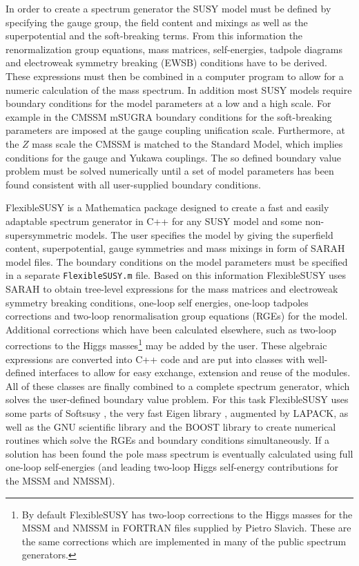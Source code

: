 \documentclass[final,3p,11pt,pdflatex]{elsarticle}
\makeatletter
\newcommand{\sarah}{SARAH\@\xspace}
\newcommand{\fs}{FlexibleSUSY\@\xspace}
\newcommand{\mathematica}{Mathematica\xspace}
\newcommand{\code}[1]{\lstinline|#1|}  %
\makeatother
\begin{document}
In order to create a spectrum generator the SUSY model must be defined
by specifying the gauge group, the field content and mixings as well
as the superpotential and the soft-breaking terms.  From this
information the renormalization group equations, mass matrices,
self-energies, tadpole diagrams and electroweak symmetry breaking
(EWSB) conditions have to be derived.  These expressions must then be
combined in a computer program to allow for a numeric calculation of
the mass spectrum.  In addition most SUSY models require boundary
conditions for the model parameters at a low and a high scale.  For
example in the CMSSM mSUGRA boundary conditions for the soft-breaking
parameters are imposed at the gauge coupling unification scale.
Furthermore, at the $Z$ mass scale the CMSSM is matched to the Standard
Model, which implies conditions for the gauge and Yukawa couplings.
The so defined boundary value problem must be solved numerically until
a set of model parameters has been found consistent with all
user-supplied boundary conditions.

\fs is a \mathematica package designed to create a fast and easily
adaptable spectrum generator in C++ for any SUSY model and some
non-supersymmetric models.  The user specifies the model by giving the
superfield content, superpotential, gauge symmetries and mass mixings
in form of \sarah model files.  The boundary conditions on the model
parameters must be specified in a separate \code{FlexibleSUSY.m} file.
Based on this information \fs uses \sarah to obtain tree-level
expressions for the mass matrices and electroweak symmetry breaking
conditions, one-loop self energies, one-loop tadpoles corrections and
two-loop renormalisation group equations (RGEs) for the model.
Additional corrections which have been calculated elsewhere, such as
two-loop corrections to the Higgs masses\footnote{By default
  FlexibleSUSY has two-loop corrections to the Higgs masses for the
  MSSM
  \cite{Degrassi:2001yf,Brignole:2001jy,Dedes:2002dy,Brignole:2002bz,Dedes:2003km}
  and NMSSM \cite{Degrassi:2009yq} in FORTRAN files supplied by Pietro
  Slavich. These are the same corrections which are implemented in
  many of the public spectrum generators.} may be added by the user.
%
These algebraic expressions are converted into C++ code and are put
into classes with well-defined interfaces to allow for easy exchange,
extension and reuse of the modules.  All of these classes are finally
combined to a complete spectrum generator, which solves the
user-defined boundary value problem.  For this task \fs uses some
parts of Softsusy \cite{Allanach:2001kg}, the very fast Eigen library
\cite{eigen}, augmented by LAPACK, as well as the GNU scientific
library and the BOOST library to create numerical routines which solve
the RGEs and boundary conditions simultaneously.  If a solution has
been found the pole mass spectrum is eventually calculated using full
one-loop self-energies (and leading two-loop Higgs self-energy
contributions for the MSSM and NMSSM).
\end{document}
